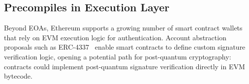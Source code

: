 



\subsection{Precompiles in Execution Layer}\label{subsec:precompiles}

Beyond EOAs, Ethereum supports a growing number of smart contract wallets that rely on EVM execution logic for authentication. 
Account abstraction proposals such as ERC-4337~\cite{ref_ethereum_aa} enable smart contracts to define custom signature verification logic, opening a potential path for post-quantum cryptography: contracts could implement post-quantum signature verification directly in EVM bytecode.


